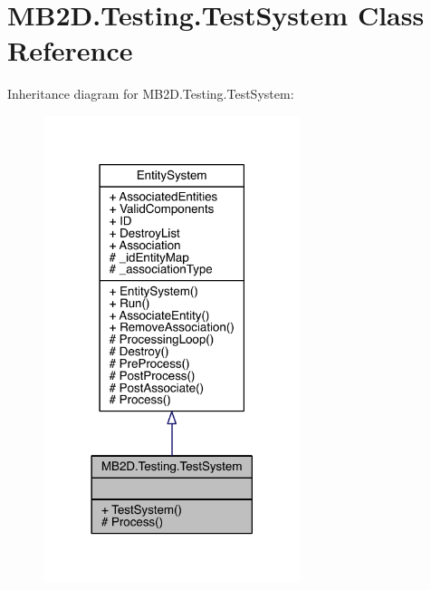 \hypertarget{class_m_b2_d_1_1_testing_1_1_test_system}{}\section{M\+B2\+D.\+Testing.\+Test\+System Class Reference}
\label{class_m_b2_d_1_1_testing_1_1_test_system}


Inheritance diagram for M\+B2\+D.\+Testing.\+Test\+System\+:
\nopagebreak
\begin{figure}[H]
\begin{center}
\leavevmode
\includegraphics[width=213pt]{class_m_b2_d_1_1_testing_1_1_test_system__inherit__graph}
\end{center}
\end{figure}


